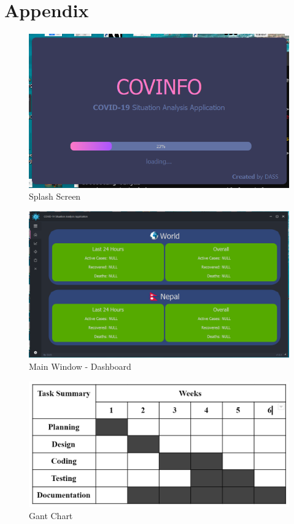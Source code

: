 \documentclass[12pt]{article}
\begin{document}
\section{Appendix}
\begin{figure}[h]
    \centerline{\includegraphics[width = 150mm]{SplashScreen.PNG}}
    \caption{Splash Screen}
\end{figure}
\clearpage
\thispagestyle{empty}
\begin{figure}[h]
    \centerline{\includegraphics[width = 150mm]{MainWindowDashBoard.PNG}}
    \caption{Main Window - Dashboard}
\end{figure}
\clearpage
\thispagestyle{empty}
\begin{figure}[h]
    \centerline{\includegraphics[width = 190mm]{chart.png}}
    \caption{Gant Chart}
    \label{fig}
\end{figure}
\begin{figure}[h]
\end{figure}
\end{document}
